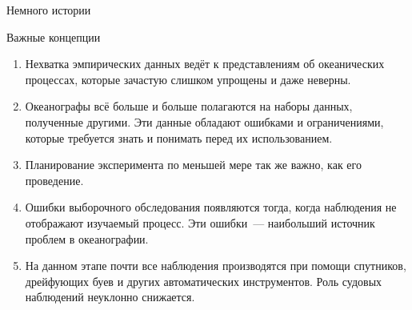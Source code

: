 \begin{chapter}{Немного истории}
\begin{section}{Важные концепции}
\begin{enumerate}
\item
Нехватка эмпирических данных ведёт к представлениям об океанических
процессах, которые зачастую слишком упрощены и даже неверны.
%

\item
Океанографы всё больше и больше полагаются на наборы данных, полученные
другими. Эти данные обладают ошибками и ограничениями, которые требуется
знать и понимать перед их использованием.
%

\item
Планирование эксперимента по меньшей мере так же важно, как его
проведение.
%

\item
Ошибки выборочного обследования появляются тогда, когда наблюдения не 
отображают изучаемый процесс. Эти ошибки~--- наибольший источник проблем в
океанографии.
%

\item
На данном этапе почти все наблюдения производятся при помощи спутников,
дрейфующих буев и других автоматических инструментов. Роль судовых наблюдений
неуклонно снижается.
%
\end{enumerate}
\end{section}

\end{chapter}
